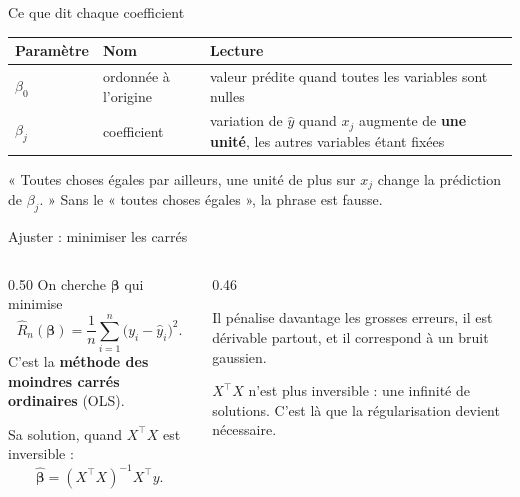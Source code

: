 \begin{frame}{Ce que dit chaque coefficient}
\begin{center}
\small
\begin{tabular}{@{}p{}p{}p{}@{}}
\toprule
\textbf{Paramètre} & \textbf{Nom} & \textbf{Lecture} \\
\midrule
$\beta_0$ & ordonnée à l'origine & valeur prédite quand toutes les variables
sont nulles \\
$\beta_j$ & coefficient & variation de $\hat y$ quand $x_j$ augmente de
\textbf{une unité}, les autres variables étant fixées \\
\bottomrule
\end{tabular}
\end{center}
\vspace{2mm}
\begin{wbox}
« Toutes choses égales par ailleurs, une unité de plus sur $x_j$ change la
prédiction de $\beta_j$. » Sans le « toutes choses égales », la phrase est fausse.
\end{wbox}
\end{frame}

\begin{frame}{Ajuster : minimiser les carrés}
\begin{columns}[t]
\begin{column}{0.50\textwidth}
On cherche $\boldsymbol\beta$ qui minimise
\[
  \hat R_n(\boldsymbol\beta)=\frac{1}{n}\sum_{i=1}^{n}\big(y_i-\hat
  y_i\big)^2 .
\]
C'est la \textbf{méthode des moindres carrés ordinaires} (OLS).

\vspace{1mm}
Sa solution, quand $X^\top X$ est inversible :
\[
  \hat{\boldsymbol\beta}=(X^\top X)^{-1}X^\top y .
\]
\end{column}
\begin{column}{0.46\textwidth}
\begin{kbox}
Il pénalise davantage les grosses erreurs, il est dérivable partout, et il
correspond à un bruit gaussien.
\end{kbox}
\begin{wbox}
$X^\top X$ n'est plus inversible : une infinité de solutions. C'est là que la
régularisation devient nécessaire.
\end{wbox}
\end{column}
\end{columns}
\end{frame}

